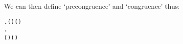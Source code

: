 We can then define
`precongruence' and `congruence' thus:
\begin{alltt}
  \HOLSymConst{\HOLTokenEquiv{}}
\HOLSymConst{\HOLTokenForall{}}  .   \HOLSymConst{\HOLTokenImp{}}    \HOLSymConst{\HOLTokenImp{}}  ( ) ( ) \HOLSymConst{\HOLTokenConj{}}  
  \HOLSymConst{\HOLTokenEquiv{}}
\HOLSymConst{\HOLTokenForall{}}  .
      \HOLSymConst{\HOLTokenImp{}}    \HOLSymConst{\HOLTokenImp{}}  ( ) ( ) \HOLSymConst{\HOLTokenConj{}}  
\end{alltt}

